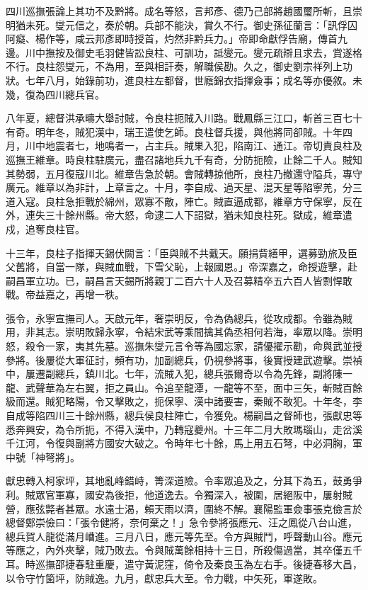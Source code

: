 \begin{pinyinscope}
四川巡撫張論上其功不及黔將。成名等怒，言邦彥、德乃己部將趙國璽所斬，且崇明猶未死。燮元信之，奏於朝。兵部不能決，賞久不行。御史孫征蘭言：「訊俘囚阿癡、楊作等，咸云邦彥即時授首，灼然非黔兵力。」帝即命獻俘告廟，傳首九邊。川中撫按及御史毛羽健皆訟良柱、可訓功，詆燮元。燮元疏辯且求去，賞遂格不行。良柱怨燮元，不為用，至與相訐奏，解職侯勘。久之，御史劉宗祥列上功狀。七年八月，始錄前功，進良柱左都督，世廕錦衣指揮僉事；成名等亦優敘。未幾，復為四川總兵官。

八年夏，總督洪承疇大舉討賊，令良柱扼賊入川路。戰鳳縣三江口，斬首三百七十有奇。明年冬，賊犯漢中，瑞王遣使乞師。良柱督兵援，與他將同卻賊。十年四月，川中地震者七，地鳴者一，占主兵。賊果入犯，陷南江、通江。帝切責良柱及巡撫王維章。時良柱駐廣元，盡召諸地兵九千有奇，分防扼險，止餘二千人。賊知其勢弱，五月復寇川北。維章告急於朝。會賊轉掠他所，良柱乃撤還守隘兵，專守廣元。維章以為非計，上章言之。十月，李自成、過天星、混天星等陷寧羌，分三道入寇。良柱急拒戰於綿州，眾寡不敵，陣亡。賊直逼成都，維章方守保寧，反在外，連失三十餘州縣。帝大怒，命逮二人下詔獄，猶未知良柱死。獄成，維章遣戍，追奪良柱官。

十三年，良柱子指揮天錫伏闕言：「臣與賊不共戴天。願捐貲繕甲，選募勁旅及臣父舊將，自當一隊，與賊血戰，下雪父恥，上報國恩。」帝深嘉之，命授遊擊，赴嗣昌軍立功。已，嗣昌言天錫所將親丁二百六十人及召募精卒五六百人皆剽悍敢戰。帝益嘉之，再增一秩。

張令，永寧宣撫司人。天啟元年，奢崇明反，令為偽總兵，從攻成都。令雖為賊用，非其志。崇明敗歸永寧，令結宋武等乘間擒其偽丞相何若海，率眾以降。崇明怒，殺令一家，夷其先墓。巡撫朱燮元言令等為國忘家，請優擢示勸，命與武並授參將。後屢從大軍征討，頻有功，加副總兵，仍視參將事，後實授建武遊擊。崇禎中，屢遷副總兵，鎮川北。七年，流賊入犯，總兵張爾奇以令為先鋒，副將陳一龍、武聲華為左右翼，拒之員山。令追至龍潭，一龍等不至，面中三矢，斬賊百餘級而還。賊犯略陽，令又擊敗之，扼保寧、漢中諸要害，秦賊不敢犯。十年冬，李自成等陷四川三十餘州縣，總兵侯良柱陣亡，令獲免。楊嗣昌之督師也，張獻忠等悉奔興安，為令所扼，不得入漢中，乃轉寇夔州。十三年二月大敗瑪瑙山，走岔溪千江河，令復與副將方國安大破之。令時年七十餘，馬上用五石弩，中必洞胸，軍中號「神弩將」。

獻忠轉入柯家坪，其地亂峰錯峙，箐深道險。令率眾追及之，分其下為五，鼓勇爭利。賊眾官軍寡，國安為後拒，他道逸去。令獨深入，被圍，居絕阪中，屢射賊營，應弦斃者甚眾。水遠士渴，賴天雨以濟，圍終不解。襄陽監軍僉事張克儉言於總督鄭崇儉曰：「張令健將，奈何棄之！」急令參將張應元、汪之鳳從八台山進，總兵賀人龍從滿月嶆進。三月八日，應元等先至。令方與賊鬥，呼聲動山谷。應元等應之，內外夾擊，賊乃敗去。令與賊萬餘相持十三日，所殺傷過當，其卒僅五千耳。時巡撫邵捷春駐重慶，遣守黃泥窪，倚令及秦良玉為左右手。後捷春移大昌，以令守竹箘坪，防賊逸。九月，獻忠兵大至。令力戰，中矢死，軍遂敗。


\end{pinyinscope}
